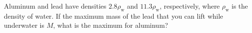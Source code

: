 Aluminum and lead have densities $2.8\rho_\text{w}$ and
$11.3\rho_\text{w}$, respectively, where $\rho_\text{w}$ is the
density of water. If the maximum mass of the lead that you can lift
while underwater is $M$, what is the maximum for aluminum?\answercheck
